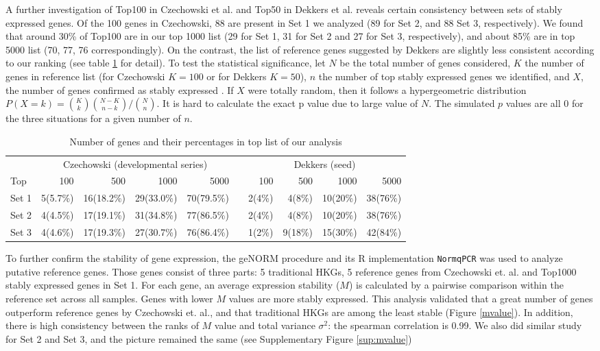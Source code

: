 \documentclass[11pt, a4paper]{article}
\begin{document}
A further investigation of Top100 in Czechowski et al. and Top50 in Dekkers et al. reveals certain consistency between sets of stably expressed genes. Of the 100 genes in  Czechowski, 88 are present in Set 1 we analyzed (89 for Set 2, and 88  Set 3, respectively). We found that around 30\% of Top100 are in our top 1000 list (29 for Set 1, 31 for Set 2 and 27 for Set 3, respectively), and about 85\% are in top 5000 list (70, 77, 76 correspondingly).  On the contrast, the list of reference genes suggested by Dekkers are slightly less consistent according to our ranking (see table \ref{table:stablegenerank} for detail). To test the statistical significance, let $N$ be the total number of genes considered, $K$ the number of genes in reference list (for Czechowski $K=100$ or for Dekkers $K=50$), $n$ the number of top stably expressed genes we identified,  and $X$, the number of genes confirmed as stably expressed .  If $X$ were totally random, then it follows a hypergeometric distribution $P(X = k) = {K \choose k}{N-K \choose n-k}/{N\choose n}$. It is hard to calculate the exact p value due to large value of $N$. The simulated $p$ values are all 0 for the three situations for a given number of $n$. 
\begin{table}[h]
\caption{Number of genes and their percentages in top list of our analysis}
\label{table:stablegenerank}
\begin{tabular}{lrrrr r rrrr} \hline
 & \multicolumn{4}{c}{Czechowski (developmental series)} & & \multicolumn{4}{c}{Dekkers (seed)} \\ \cmidrule(r){2-10}
Top   &   100  & 500     & 1000     & 5000  &  & 100    & 500    & 1000    & 5000    \\ \hline
Set 1 &  5(5.7\%)   & 16(18.2\%)  & 29(33.0\%)  &70(79.5\%)  & &2(4\%)  &  4(8\%)  &10(20\%) & 38(76\%)   \\
Set 2 & 4(4.5\%)    &17(19.1\%)   & 31(34.8\%)  &77(86.5\%) & &2(4\%)  &  4(8\%)  &10(20\%) & 38(76\%)   \\
Set 3 &4(4.6\%)     &17(19.3\%)   &27(30.7\%)   &76(86.4\%) &  &1(2\%) & 9(18\%) &15(30\%)  & 42(84\%) \\ \hline 
\end{tabular}
\end{table}

To further confirm the stability of gene expression, the geNORM \citep{vandesompele2002accurate} procedure and its R implementation \verb"NormqPCR" \citep{kohl2013package} was used to analyze putative reference genes. Those genes consist of three parts: 5 traditional HKGs, 5 reference genes from Czechowski et. al. and Top1000 stably expressed genes in Set 1.  For each gene, an average expression stability ($M$) is calculated by a pairwise comparison within the reference set across all samples. Genes with lower $M$ values are more stably expressed. This analysis validated that a great number of genes outperform reference genes by Czechowski et. al., and that traditional HKGs are among the least stable (Figure \ref{mvalue}). In addition, there is high consistency between the ranks of $M$ value and total variance $\sigma^2$: the spearman correlation is 0.99. We also did similar study for Set 2 and Set 3, and the picture remained the same (see Supplementary Figure \ref{sup:mvalue})
\end{document}
